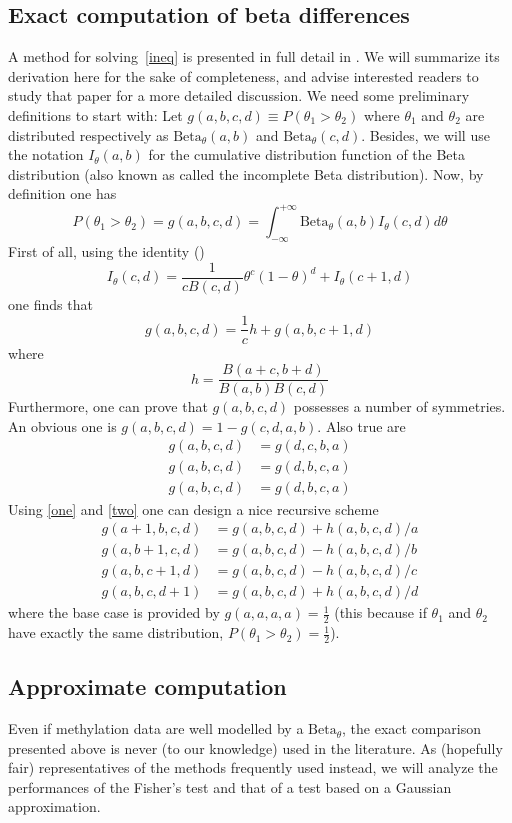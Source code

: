 \documentclass[11pt]{amsart}
\newcommand{\betapdf}{\mbox{Beta}_\theta}
\begin{document}
\subsection{Exact computation of beta differences}
A method for solving~\ref{ineq} is presented in full detail in \cite{numineq}. We will summarize its derivation here for the sake of completeness, and advise interested readers to study that paper for a more detailed discussion. 
We need some preliminary definitions to start with:
Let  $g(a,b,c,d) \equiv P(\theta_1>\theta_2)$ where $\theta_1$ and $\theta_2$ are distributed respectively as $\betapdf(a,b)$ and $\betapdf(c,d)$. Besides, we will use the notation $I_\theta(a,b)$ for the cumulative distribution function of the Beta distribution (also known as called the incomplete Beta distribution). Now, by definition one has \[P(\theta_1>\theta_2)=g(a,b,c,d)=\int_{-\infty}^{+\infty} \betapdf(a,b)I_\theta(c,d) d\theta\]
First of all,  using the identity (\cite{abramowitz}) 
\[I_\theta(c,d)=\frac{1}{cB(c,d)}\theta^c(1-\theta)^d+I_\theta(c+1,d)\] one finds that 
\[g(a,b,c,d)=\frac{1}{c}h+g(a,b,c+1,d)\]\label{one} where \[h=\frac{B(a+c,b+d)}{B(a,b)B(c,d)}\]
Furthermore, one can prove that $g(a,b,c,d)$ possesses a number of symmetries.
An obvious one is $g(a,b,c,d)=1-g(c,d,a,b)$. Also true are 
\begin{align*}
g(a,b,c,d)&=g(d,c,b,a) \\
g(a,b,c,d)&=g(d,b,c,a) \\
g(a,b,c,d)&=g(d,b,c,a) 
\end{align*}\label{two}
Using \ref{one} and \ref{two} one can design a nice recursive scheme
\begin{align*}
g(a+1,b,c,d) &= g(a,b,c,d) + h(a,b,c,d)/a \\
g(a,b+1,c,d) &= g(a,b,c,d) - h(a,b,c,d)/b \\
g(a,b,c+1,d) &= g(a,b,c,d) - h(a,b,c,d)/c \\
g(a,b,c,d+1) &= g(a,b,c,d) + h(a,b,c,d)/d 
\end{align*}
where the base case is provided by $g(a,a,a,a)=\frac{1}{2}$ (this because if $\theta_1$ and $\theta_2$ have exactly the same distribution, $P(\theta_1>\theta_2)=\frac{1}{2}$).
\subsection{Approximate computation}
Even if methylation data are well modelled by a $\betapdf$, the exact comparison presented above is never (to our knowledge) used in the literature. As (hopefully fair) representatives of the methods frequently used instead, we will analyze the performances of the Fisher's test and that of a test based on a Gaussian approximation.
\end{document}
